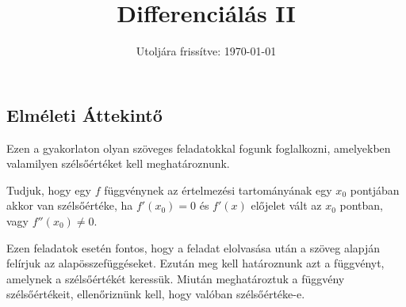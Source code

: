 \documentclass[a4paper, 12pt]{scrartcl}
\title{Differenciálás II}
\date{Utoljára frissítve: \today}
\begin{document}
\maketitle

\subsection{Elméleti Áttekintő}

\begin{blueBox}

  Ezen a gyakorlaton olyan szöveges feladatokkal fogunk foglalkozni, amelyekben
  valamilyen szélsőértéket kell meghatároznunk.

  Tudjuk, hogy egy $f$ függvénynek az értelmezési tartományának egy $x_0$
  pontjában akkor van szélsőértéke, ha $f'(x_0) = 0$ és $f'(x)$ előjelet vált
  az $x_0$ pontban, vagy $f''(x_0) \neq 0$.

  Ezen feladatok esetén fontos, hogy a feladat elolvasása után a szöveg alapján
  felírjuk az alapösszefüggéseket. Ezután meg kell határoznunk azt a függvényt,
  amelynek a szélsőértékét keressük. Miután meghatároztuk a függvény
  szélsőértékeit, ellenőriznünk kell, hogy valóban szélsőértéke-e.


\end{blueBox}
\end{document}
